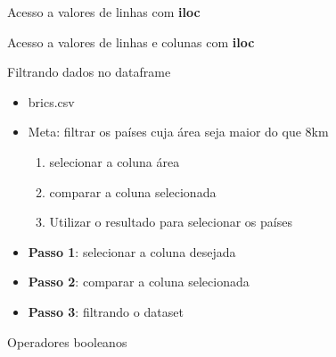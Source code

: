 %
\begin{frame}[t, fragile]{Acesso a valores de linhas com {\bf iloc}}
    
\end{frame}
%

\begin{frame}[t, fragile]{Acesso a valores de linhas e colunas com {\bf iloc}}
    
\end{frame}
%
\begin{frame}{Filtrando dados no dataframe}
  \begin{itemize}
    \item brics.csv
  \end{itemize}
    
  \framebreak
  \begin{itemize}
    \item Meta: filtrar os países cuja área seja maior do que 8km
    \begin{enumerate}
      \item selecionar a coluna área
      \item comparar a coluna selecionada
      \item Utilizar o resultado para selecionar os países
    \end{enumerate}
    \framebreak
    \item {\bf Passo 1}: selecionar a coluna desejada
     
    \framebreak
    \item {\bf Passo 2}: comparar a coluna selecionada
      
    \framebreak
    \item {\bf Passo 3}: filtrando o dataset
      
  \end{itemize}
  
\end{frame}
%
\begin{frame}{Operadores booleanos}
    
\end{frame}
%


